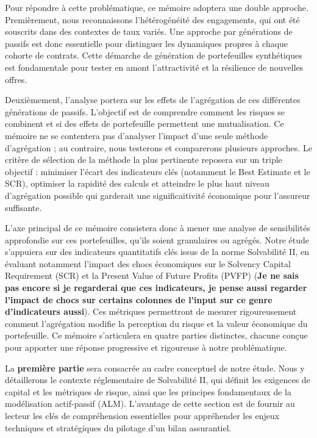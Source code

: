 Pour répondre à cette problématique, ce mémoire adoptera une double approche. Premièrement, nous reconnaissons l'hétérogénéité des engagements, qui ont été souscrits dans des contextes de taux variés. Une approche par générations de passifs est donc essentielle pour distinguer les dynamiques propres à chaque cohorte de contrats. Cette démarche de génération de portefeuilles synthétiques est fondamentale pour tester en amont l'attractivité et la résilience de nouvelles offres.\newline{}

Deuxièmement, l'analyse portera sur les effets de l'agrégation de ces différentes générations de passifs. L'objectif est de comprendre comment les risques se combinent et si des effets de portefeuille permettent une mutualisation. Ce mémoire ne se contentera pas d'analyser l'impact d'une seule méthode d'agrégation ; au contraire, nous testerons et comparerons plusieurs approches. Le critère de sélection de la méthode la plus pertinente reposera sur un triple objectif : minimiser l'écart des indicateurs clés (notamment le Best Estimate et le SCR), optimiser la rapidité des calculs et atteindre le plus haut niveau d'agrégation possible qui garderait une significaitivité économique pour l'assureur suffisante.\newline{}

L'axe principal de ce mémoire consistera donc à mener une analyse de sensibilités approfondie sur ces portefeuilles, qu'ils soient granulaires ou agrégés. Notre étude s'appuiera sur des indicateurs quantitatifs clés issus de la norme Solvabilité II, en évaluant notamment l'impact des chocs économiques sur le Solvency Capital Requirement (SCR) et la Present Value of Future Profits (PVFP) (\textbf{Je ne sais pas encore si je regarderai que ces indicateurs, je pense aussi regarder l'impact de chocs sur certains colonnes de l'input sur ce genre d'indicateurs aussi}). Ces métriques permettront de mesurer rigoureusement comment l'agrégation modifie la perception du risque et la valeur économique du portefeuille.\newpage{}
Ce mémoire s'articulera en quatre parties distinctes, chacune conçue pour apporter une réponse progressive et rigoureuse à notre problématique.\newline{}


La \textbf{première partie} sera consacrée au cadre conceptuel de notre étude. Nous y détaillerons le contexte réglementaire de Solvabilité II, qui définit les exigences de capital et les métriques de risque, ainsi que les principes fondamentaux de la modélisation actif-passif (ALM). L'avantage de cette section est de fournir au lecteur les clés de compréhension essentielles pour appréhender les enjeux techniques et stratégiques du pilotage d'un bilan assurantiel.\newline{}


